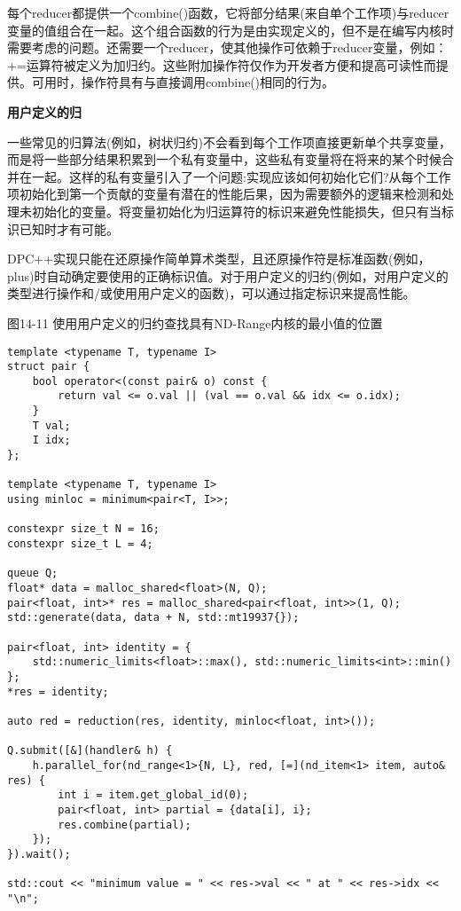 每个reducer都提供一个combine()函数，它将部分结果(来自单个工作项)与reducer变量的值组合在一起。这个组合函数的行为是由实现定义的，但不是在编写内核时需要考虑的问题。还需要一个reducer，使其他操作可依赖于reducer变量，例如：+=运算符被定义为加归约。这些附加操作符仅作为开发者方便和提高可读性而提供。可用时，操作符具有与直接调用combine()相同的行为。\par

\hspace*{\fill} \par %
\textbf{用户定义的归}

一些常见的归算法(例如，树状归约)不会看到每个工作项直接更新单个共享变量，而是将一些部分结果积累到一个私有变量中，这些私有变量将在将来的某个时候合并在一起。这样的私有变量引入了一个问题:实现应该如何初始化它们?从每个工作项初始化到第一个贡献的变量有潜在的性能后果，因为需要额外的逻辑来检测和处理未初始化的变量。将变量初始化为归运算符的标识来避免性能损失，但只有当标识已知时才有可能。\par

DPC++实现只能在还原操作简单算术类型，且还原操作符是标准函数(例如，plus)时自动确定要使用的正确标识值。对于用户定义的归约(例如，对用户定义的类型进行操作和/或使用用户定义的函数)，可以通过指定标识来提高性能。\par

\hspace*{\fill} \par %
图14-11 使用用户定义的归约查找具有ND-Range内核的最小值的位置
\begin{lstlisting}[caption={}]
template <typename T, typename I>
struct pair {
	bool operator<(const pair& o) const {
		return val <= o.val || (val == o.val && idx <= o.idx);
	}
	T val;
	I idx;
};

template <typename T, typename I>
using minloc = minimum<pair<T, I>>;

constexpr size_t N = 16;
constexpr size_t L = 4;

queue Q;
float* data = malloc_shared<float>(N, Q);
pair<float, int>* res = malloc_shared<pair<float, int>>(1, Q);
std::generate(data, data + N, std::mt19937{});

pair<float, int> identity = {
	std::numeric_limits<float>::max(), std::numeric_limits<int>::min()
};
*res = identity;

auto red = reduction(res, identity, minloc<float, int>());

Q.submit([&](handler& h) {
	h.parallel_for(nd_range<1>{N, L}, red, [=](nd_item<1> item, auto& res) {
		int i = item.get_global_id(0);
		pair<float, int> partial = {data[i], i};
		res.combine(partial);
	});
}).wait();

std::cout << "minimum value = " << res->val << " at " << res->idx << "\n";
\end{lstlisting}

